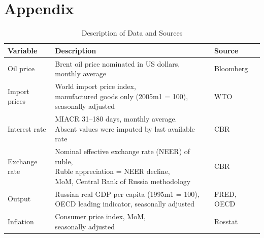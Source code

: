 \documentclass[12pt, a4paper]{extarticle}
\begin{document}
\section*{Appendix}
\label{app}
\begin{table}[h!]
	\centering
		\begin{tabular}{@{}lll@{}}
			\toprule
			Variable  & Description                                              & Source    \\ \midrule
			Oil price & \makecell[l]{Brent oil price nominated in US dollars, \\monthly average} & Bloomberg \\
			Import prices & \makecell[l]{World import price index, \\manufactured goods only (2005m1 = 100), seasonally adjusted}    & WTO        \\
			Interest rate & \makecell[l]{MIACR 31--180 days, monthly average. \\Absent values were imputed by last available rate} & CBR        \\
			Exchange rate & \makecell[l]{Nominal effective exchange rate (NEER) of ruble, \\Ruble appreciation = NEER decline, \\MoM, Central Bank of Russia methodology} & CBR        \\
			Output        & \makecell[l]{Russian real GDP per capita (1995m1 = 100), \\OECD leading indicator, seasonally adjusted}  & FRED, OECD \\
			Inflation & \makecell[l]{Consumer price index, MoM, \\seasonally adjusted }          & Rosstat   \\ \bottomrule
		\end{tabular}%
	\caption{Description of Data and Sources}
	\label{table:variables_decription}
\end{table}
\end{document}
